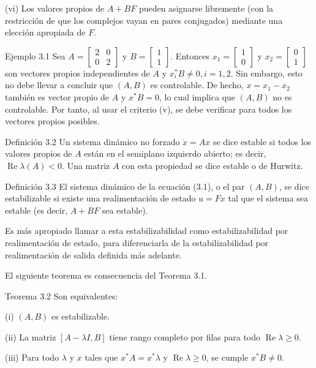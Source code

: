 \documentclass[11pt]{article}
\begin{document}
(vi) Los valores propios de $A+B F$ pueden asignarse libremente (con la restricción de que los complejos vayan en pares conjugados) mediante una elección apropiada de $F$.

Ejemplo 3.1 Sea $A=\left[\begin{array}{ll}2 & 0 \\ 0 & 2\end{array}\right]$ y $B=\left[\begin{array}{l}1 \\ 1\end{array}\right]$. Entonces $x_{1}=\left[\begin{array}{l}1 \\ 0\end{array}\right]$ y $x_{2}=\left[\begin{array}{l}0 \\ 1\end{array}\right]$ son vectores propios independientes de $A$ y $x_{i}^{*} B \neq 0, i=1,2$. Sin embargo, esto no debe llevar a concluir que $(A, B)$ es controlable. De hecho, $x=x_{1}-x_{2}$ también es vector propio de $A$ y $x^{*} B=0$, lo cual implica que $(A, B)$ no es controlable. Por tanto, al usar el criterio (v), se debe verificar para todos los vectores propios posibles.

Definición 3.2 Un sistema dinámico no forzado $\dot{x}=A x$ se dice estable si todos los valores propios de $A$ están en el semiplano izquierdo abierto; es decir, $\operatorname{Re} \lambda(A)<0$. Una matriz $A$ con esta propiedad se dice estable o de Hurwitz.

Definición 3.3 El sistema dinámico de la ecuación (3.1), o el par $(A, B)$, se dice estabilizable si existe una realimentación de estado $u=F x$ tal que el sistema sea estable (es decir, $A+B F$ sea estable).

Es más apropiado llamar a esta estabilizabilidad como estabilizabilidad por realimentación de estado, para diferenciarla de la estabilizabilidad por realimentación de salida definida más adelante.

El siguiente teorema es consecuencia del Teorema 3.1.

Teorema 3.2 Son equivalentes:

(i) $(A, B)$ es estabilizable.

(ii) La matriz $[A-\lambda I, B]$ tiene rango completo por filas para todo $\operatorname{Re} \lambda \geq 0$.

(iii) Para todo $\lambda$ y $x$ tales que $x^{*} A=x^{*} \lambda$ y $\operatorname{Re} \lambda \geq 0$, se cumple $x^{*} B \neq 0$.
\end{document}
